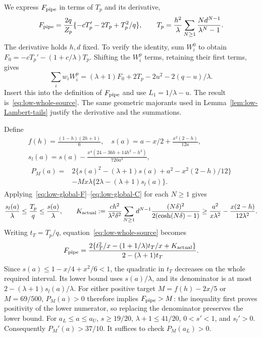 We express $F_{\rm pipe}$ in terms of $T_p$ and its derivative,
\begin{equation}\label{eq:low-whole-source}
 F_{\rm pipe}=\frac{2q}{Z_p}\{-cT_p'-2T_p+T_p^2/q\},
 \qquad
 T_p=\frac{h^2}\lambda
                  \sum_{N\ge1}\frac{N d^{N-1}}{\lambda^N-1}.
\end{equation}
The derivative holds $h,d$ fixed.  To verify the identity, sum
$W_i^0$ to obtain $F_0=-cT_p'-(1+c/\lambda)T_p$.
Shifting the $W_i^p$ terms, retaining their first terms, gives
\[
 \sum_iw_iW_i^p=(\lambda+1)F_0+2T_p-2u^2-2(q-u)/\lambda.
\]
Insert this into the definition of $F_{\rm pipe}$ and use
$L_1=1/\lambda-u$.  The result is~\eqref{eq:low-whole-source}.
The same geometric majorants used in Lemma~\ref{lem:low-Lambert-tails}
justify the derivative and the summations.

Define
\begin{equation}\label{eq:low-source-rationals}
 \begin{gathered}
 f(h)=\frac{(1-h)(2h+1)}6,\quad
 s(a)=a-x/2+\frac{x^2(2-h)}{12a},\\
 s_l(a)=s(a)-\frac{x^4(24-36h+14h^2-h^3)}{720a^3},\\
 \begin{aligned}
 P_M(a)={}&2\{s(a)^2-(\lambda+1)s(a)+a^2-x^2(2-h)/12\}\\
 &-Mx\lambda\{2\lambda-(\lambda+1)s_l(a)\}.
 \end{aligned}
 \end{gathered}
\end{equation}
Applying~\eqref{eq:low-global-F}--\eqref{eq:low-global-C}
for each $N\ge1$ gives
\[
 \frac{s_l(a)}\lambda\le\frac{T_p}{q}\le\frac{s(a)}\lambda,
 \qquad
 K_{\rm actual}:=\frac{ch^2}{\lambda^2\delta^2}
       \sum_{N\ge1}d^{N-1}
         \frac{(N\delta)^2}{2(\cosh(N\delta)-1)}
 \ge\frac{a^2}{x\lambda^2}-\frac{x(2-h)}{12\lambda^2}.
\]
Writing $t_T=T_p/q$, equation~\eqref{eq:low-whole-source} becomes
\[
 F_{\rm pipe}=
 \frac{2\{t_T^2/x-(1+1/\lambda)t_T/x+K_{\rm actual}\}}
                 {2-(\lambda+1)t_T}.
\]
Since $s(a)\le1-x/4+x^2/6<1$, the quadratic in $t_T$ decreases
on the whole required interval.  Its lower bound uses $s(a)/\lambda$,
and its denominator is at most $2-(\lambda+1)s_l(a)/\lambda$.
For either positive target $M=f(h)-2x/5$ or $M=69/500$,
$P_M(a)>0$ therefore implies $F_{\rm pipe}>M$: the inequality
first proves positivity of the lower numerator, so replacing the
denominator preserves the lower bound. For $a_L\le a\le a_U$,
$s\ge19/20$, $\lambda+1\le41/20$, $0<s'<1$, and $s_l'>0$.
Consequently $P_M'(a)>37/10$.  It suffices to check $P_M(a_L)>0$.

